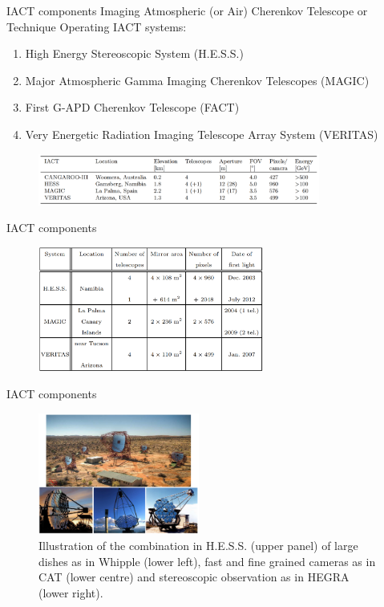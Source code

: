 \documentclass{beamer}
\begin{document}
\begin{frame}{IACT components}
	Imaging Atmospheric (or Air) Cherenkov Telescope or Technique
	\newline
	Operating IACT systems:
	\begin{enumerate}
		\item High Energy Stereoscopic System (H.E.S.S.)
		\item Major Atmospheric Gamma Imaging Cherenkov Telescopes (MAGIC)
		\item First G-APD Cherenkov Telescope (FACT)
		\item Very Energetic Radiation Imaging Telescope Array System (VERITAS)
	\end{enumerate}
	\begin{figure}[h]
		\includegraphics[width=350px]{IACT_tables.png}
	\end{figure}
\end{frame}

\begin{frame}{IACT components}
	\begin{figure}[h]
		\includegraphics[width=280px]{ICATsystems.png}
	\end{figure}
\end{frame}


\begin{frame}{IACT components}
	\begin{figure}[h]
		\includegraphics[width=200px]{dishes.png}
		\caption{Illustration of the combination in H.E.S.S. (upper panel) of large dishes as in Whipple (lower left), fast and fine grained cameras as in CAT (lower centre) and stereoscopic observation as in HEGRA (lower right).}
	\end{figure}
\end{frame}
\end{document}
